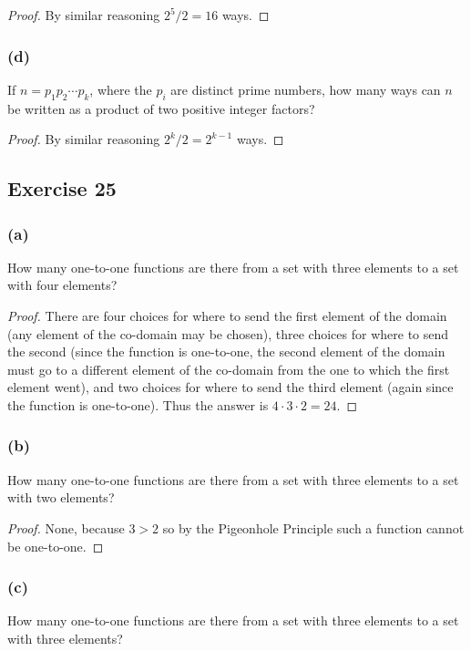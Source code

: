 \documentclass[14pt]{extarticle}
\begin{document}
\begin{proof}
By similar reasoning \(2^5 / 2 = 16\) ways.
\end{proof}

\subsubsection{(d)}
If \(n = p_1p_2 \cdots p_k\), where the \(p_i\) are distinct prime numbers, how many ways can \(n\) be written 
as a product of two positive integer factors?

\begin{proof}
By similar reasoning \(2^k / 2 = 2^{k-1}\) ways.
\end{proof}

\subsection{Exercise 25}
\subsubsection{(a)}
How many one-to-one functions are there from a set with three elements to a set with four elements?

\begin{proof}
There are four choices for where to send the first element of the domain (any element of the co-domain may be chosen), three 
choices for where to send the second (since the function is one-to-one, the second element of the domain must go to a 
different element of the co-domain from the one to which the first element went), and two choices for where to send the 
third element (again since the function is one-to-one). Thus the answer is \(4 \cdot 3 \cdot 2 = 24\).
\end{proof}

\subsubsection{(b)}
How many one-to-one functions are there from a set with three elements to a set with two elements?

\begin{proof}
None, because \(3 > 2\) so by the Pigeonhole Principle such a function cannot be one-to-one.
\end{proof}

\subsubsection{(c)}
How many one-to-one functions are there from a set with three elements to a set with three elements?
\end{document}
